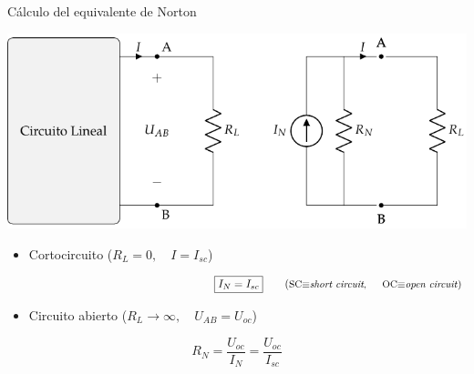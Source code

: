 \documentclass[aspectratio=169, xcolor={usenames,svgnames,dvipsnames}]{beamer}
\begin{document}
\begin{frame}{Cálculo del equivalente de Norton}
    \vspace{2mm}
    \begin{center}
    \includegraphics[height=0.43\textheight]{../figs/EquivalenteNorton_R.pdf}
    \end{center}
    
    \begin{itemize}
    \item Cortocircuito (\(R_L = 0, \quad I = I_{sc}\))
    \end{itemize}

    \vspace{-8mm}
    \[
    \hspace{65mm}
    \boxed{I_N = I_{sc}}
    \qquad \textrm{(\small{SC$\equiv$\textit{short circuit}, \hspace*{4mm}OC$\equiv$\textit{open circuit}})}
    \]  
    
    \vspace{1mm}
    \begin{itemize}
    \item Circuito abierto (\(R_L \to \infty, \quad U_{AB} = U_{oc}\))
    \end{itemize}

    \vspace{-3mm}
    \[
    \boxed{R_N = \frac{U_{oc}}{I_N} = \frac{U_{oc}}{I_{sc}}}
    \]
\end{frame}

\end{document}
